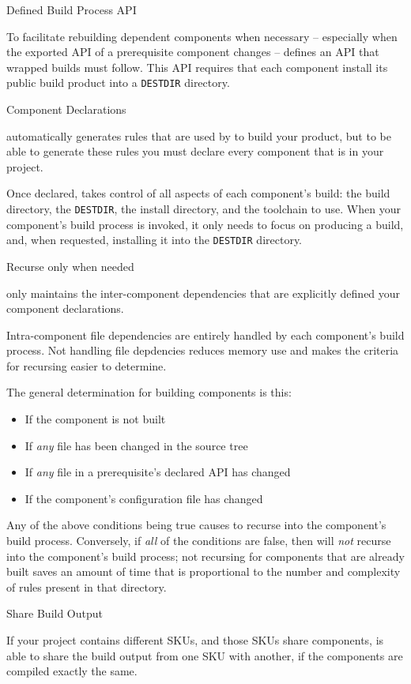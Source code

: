 \begin{description}
\item Defined Build Process API

  To facilitate rebuilding dependent components when necessary --
  especially when the exported API of a prerequisite component changes
  -- \lmsbw defines an API that wrapped builds must follow.  This API
  requires that each component install its public build product into a
  \texttt{DESTDIR} directory.

\item Component Declarations

  \lmsbw automatically generates rules that are used by \make to build
  your product, but to be able to generate these rules you must
  declare every component that is in your project.

  Once declared, \lmsbw takes control of all aspects of each
  component's build: the build directory, the \texttt{DESTDIR}, the
  install directory, and the toolchain to use.  When your component's
  build process is invoked, it only needs to focus on producing a
  build, and, when requested, installing it into the \texttt{DESTDIR}
  directory.

\item Recurse only when needed

  \lmsbw only maintains the inter-component dependencies that are
  explicitly defined your component declarations.

  Intra-component file dependencies are entirely handled by each
  component's build process.  Not handling file depdencies reduces
  memory use and makes the criteria for recursing easier to determine.

  The general determination for building components is this:

  \begin{itemize}
  \item If the component is not built
  \item If \emph{any} file has been changed in the source tree
  \item If \emph{any} file in a prerequisite's declared API has
    changed
  \item If the component's configuration file has changed
  \end{itemize}

  Any of the above conditions being true causes \lmsbw to recurse into
  the component's build process.  Conversely, if \emph{all} of the
  conditions are false, then \lmsbw will \emph{not} recurse into the
  component's build process; not recursing for components that are
  already built saves an amount of time that is proportional to the
  number and complexity of \make rules present in that directory.

\item Share Build Output

  If your project contains different SKUs, and those SKUs share
  components, \lmsbw is able to share the build output from one SKU
  with another, if the components are compiled exactly the same.

\end{description}

